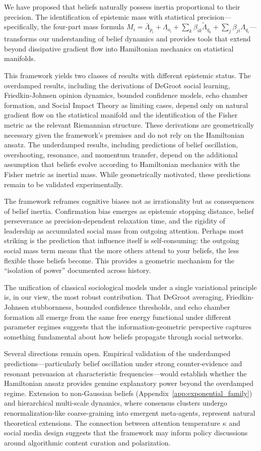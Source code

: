 \documentclass[12pt]{article}
\begin{document}
We have proposed that beliefs naturally possess inertia proportional to their precision. The identification of epistemic mass with statistical precision---specifically, the four-part mass formula $M_i = \bar{\Lambda}_{p_i} + \Lambda_{o_i} + \sum_k \beta_{ik}\tilde{\Lambda}_{q_k} + \sum_j \beta_{ji}\Lambda_{q_i}$---transforms our understanding of belief dynamics and provides tools that extend beyond dissipative gradient flow into Hamiltonian mechanics on statistical manifolds.

This framework yields two classes of results with different epistemic status. The overdamped results, including the derivations of DeGroot social learning, Friedkin-Johnsen opinion dynamics, bounded confidence models, echo chamber formation, and Social Impact Theory as limiting cases, depend only on natural gradient flow on the statistical manifold and the identification of the Fisher metric as the relevant Riemannian structure. These derivations are geometrically necessary given the framework's premises and do not rely on the Hamiltonian ansatz. The underdamped results, including predictions of belief oscillation, overshooting, resonance, and momentum transfer, depend on the additional assumption that beliefs evolve according to Hamiltonian mechanics with the Fisher metric as inertial mass. While geometrically motivated, these predictions remain to be validated experimentally.

The framework reframes cognitive biases not as irrationality but as consequences of belief inertia. Confirmation bias emerges as epistemic stopping distance, belief perseverance as precision-dependent relaxation time, and the rigidity of leadership as accumulated social mass from outgoing attention. Perhaps most striking is the prediction that influence itself is self-consuming: the outgoing social mass term means that the more others attend to your beliefs, the less flexible those beliefs become. This provides a geometric mechanism for the ``isolation of power'' documented across history.

The unification of classical sociological models under a single variational principle is, in our view, the most robust contribution. That DeGroot averaging, Friedkin-Johnsen stubbornness, bounded confidence thresholds, and echo chamber formation all emerge from the same free energy functional under different parameter regimes suggests that the information-geometric perspective captures something fundamental about how beliefs propagate through social networks.

Several directions remain open. Empirical validation of the underdamped predictions---particularly belief oscillation under strong counter-evidence and resonant persuasion at characteristic frequencies---would establish whether the Hamiltonian ansatz provides genuine explanatory power beyond the overdamped regime. Extension to non-Gaussian beliefs (Appendix~\ref{app:exponential_family}) and hierarchical multi-scale dynamics, where consensus clusters undergo renormalization-like coarse-graining into emergent meta-agents, represent natural theoretical extensions. The connection between attention temperature $\kappa$ and social media design suggests that the framework may inform policy discussions around algorithmic content curation and polarization.
\end{document}
